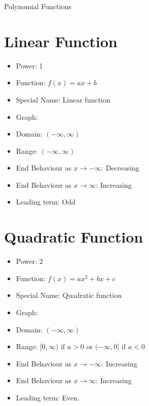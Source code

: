 \documentclass{article}
\begin{document}
\begin{center}
    \Huge Polynomial Functions 
\end{center}
\section*{Linear Function}

\begin{itemize}
    \item Power: 1
    \item Function: $f(x) = ax + b$
    \item Special Name: Linear function
    \item Graph:
    
    \item Domain: $(-\infty, \infty)$
    \item Range: $(-\infty, \infty)$
    \item End Behaviour as $x \rightarrow -\infty$: Decreasing
    \item End Behaviour as $x \rightarrow \infty$: Increasing
    \item Leading term: Odd
\end{itemize}
\newpage 

\section*{Quadratic Function}

\begin{itemize}
    \item Power: 2
    \item Function: $f(x) = ax^2 + bx + c$
    \item Special Name: Quadratic function
    \item Graph:
    
    
    \item Domain: $(-\infty, \infty)$
    \item Range: $[0, \infty)$ if $a > 0$ or $(-\infty, 0]$ if $a < 0$
    \item End Behaviour as $x \rightarrow -\infty$: Increasing
    \item End Behaviour as $x \rightarrow \infty$: Increasing
    \item Leading term: Even.
\end{itemize}
\newpage 
\end{document}
